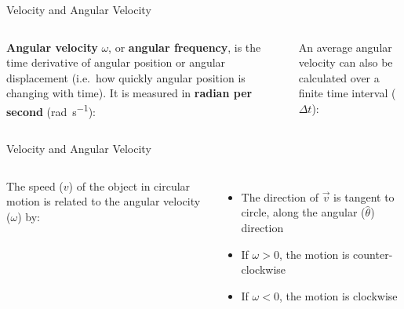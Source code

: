 \documentclass[12pt,compress,aspectratio=169]{beamer}
\begin{document}
\begin{frame}{Velocity and Angular Velocity}
  \begin{columns}[T]
    
    

    \vspace{-.1in}\textbf{Angular velocity} $\omega$, or \textbf{angular
      frequency}, is the time derivative of angular position or angular
    displacement (i.e.\ how quickly angular position is changing with time). It
    is measured in \textbf{radian per second} (\si{\radian\per\second}):
      

    \vspace{-.05in}An average angular velocity can also be calculated over a
    finite time interval ($\Delta t$):

  \end{columns}
\end{frame}




\begin{frame}{Velocity and Angular Velocity}
  \begin{columns}[T]
    
    
    The speed ($v$) of the object in circular motion is related to the angular
    velocity ($\omega$) by:

    \begin{itemize}
    \item\vspace{-.2in}The direction of $\vec v$ is tangent to circle, along
      the angular ($\hat\theta$) direction %
    \item If $\omega>0$, the motion is counter-clockwise
    \item If $\omega<0$, the motion is clockwise
    \end{itemize}
  \end{columns}
\end{frame}
\end{document}
